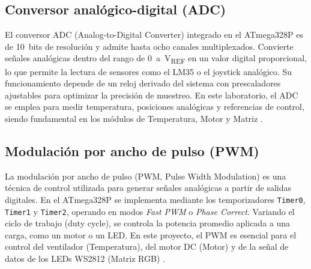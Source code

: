 \subsection{Conversor analógico-digital (ADC)}

El conversor ADC (Analog-to-Digital Converter) integrado en el ATmega328P es de 10~bits de resolución y admite hasta ocho canales multiplexados. Convierte señales analógicas dentro del rango de 0~a~V\textsubscript{REF} en un valor digital proporcional, lo que permite la lectura de sensores como el LM35 o el joystick analógico. Su funcionamiento depende de un reloj derivado del sistema con prescaladores ajustables para optimizar la precisión de muestreo. En este laboratorio, el ADC se emplea para medir temperatura, posiciones analógicas y referencias de control, siendo fundamental en los módulos de Temperatura, Motor y Matriz \cite{atmega328p_datasheet, mazidi_avr_2014}.


\subsection{Modulación por ancho de pulso (PWM)}

La modulación por ancho de pulso (PWM, Pulse Width Modulation) es una técnica de control utilizada para generar señales analógicas a partir de salidas digitales. En el ATmega328P se implementa mediante los temporizadores \texttt{Timer0}, \texttt{Timer1} y \texttt{Timer2}, operando en modos \textit{Fast PWM} o \textit{Phase Correct}. Variando el ciclo de trabajo (duty cycle), se controla la potencia promedio aplicada a una carga, como un motor o un LED. En este proyecto, el PWM es esencial para el control del ventilador (Temperatura), del motor DC (Motor) y de la señal de datos de los LEDs WS2812 (Matriz RGB) \cite{atmega328p_datasheet}.


